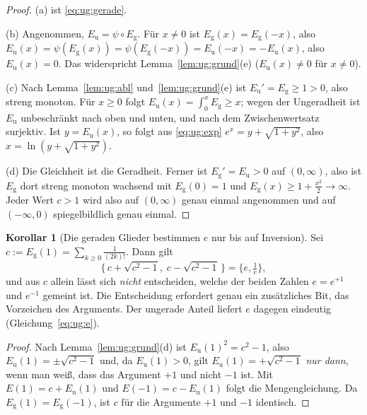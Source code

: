 \documentclass[a4paper,12pt,twoside]{report}
\theoremstyle{definition}
\newtheorem{korollar}{Korollar}
\begin{document}
\begin{proof}
(a) ist \eqref{eq:ug:gerade}.

(b) Angenommen, $E_{\mathrm u}=\psi\circ E_{\mathrm g}$. Für $x\ne0$ ist $E_{\mathrm g}(x)=E_{\mathrm g}(-x)$, also $E_{\mathrm u}(x)=\psi(E_{\mathrm g}(x))=\psi(E_{\mathrm g}(-x))=E_{\mathrm u}(-x)=-E_{\mathrm u}(x)$, also $E_{\mathrm u}(x)=0$. Das widerspricht Lemma~\ref{lem:ug:grund}(e) ($E_{\mathrm u}(x)\ne0$ für $x\neq0$).

(c) Nach Lemma~\ref{lem:ug:abl} und~\ref{lem:ug:grund}(e) ist $E_{\mathrm u}'=E_{\mathrm g}\ge1>0$, also streng monoton. Für $x\ge0$ folgt $E_{\mathrm u}(x)=\int_0^xE_{\mathrm g}\ge x$; wegen der Ungeradheit ist $E_{\mathrm u}$ unbeschränkt nach oben und unten, und nach dem Zwischenwertsatz surjektiv. Ist $y=E_{\mathrm u}(x)$, so folgt aus \eqref{eq:ug:exp} $e^x=y+\sqrt{1+y^2}$, also $x=\ln(y+\sqrt{1+y^2})$.

(d) Die Gleichheit ist die Geradheit. Ferner ist $E_{\mathrm g}'=E_{\mathrm u}>0$ auf $(0,\infty)$, also ist $E_{\mathrm g}$ dort streng monoton wachsend mit $E_{\mathrm g}(0)=1$ und $E_{\mathrm g}(x)\ge1+\tfrac{x^2}{2}\to\infty$. Jeder Wert $c>1$ wird also auf $(0,\infty)$ genau einmal angenommen und auf $(-\infty,0)$ spiegelbildlich genau einmal.
\end{proof}

\begin{korollar}[Die geraden Glieder bestimmen $e$ nur bis auf Inversion]\label{kor:ug:invers}
Sei $c:=E_{\mathrm g}(1)=\sum_{k\ge0}\frac1{(2k)!}$. Dann gilt
\[
\big\{\,c+\sqrt{c^2-1},\;c-\sqrt{c^2-1}\,\big\}=\Big\{e,\tfrac1e\Big\},
\]
und aus $c$ allein lässt sich \emph{nicht} entscheiden, welche der beiden Zahlen $e=e^{+1}$ und $e^{-1}$ gemeint ist. Die Entscheidung erfordert genau ein zusätzliches Bit, das Vorzeichen des Arguments. Der ungerade Anteil liefert $e$ dagegen eindeutig (Gleichung~\eqref{eq:ug:e}).
\end{korollar}

\begin{proof}
Nach Lemma~\ref{lem:ug:grund}(d) ist $E_{\mathrm u}(1)^2=c^2-1$, also $E_{\mathrm u}(1)=\pm\sqrt{c^2-1}$ und, da $E_{\mathrm u}(1)>0$, gilt $E_{\mathrm u}(1)=+\sqrt{c^2-1}$ \emph{nur dann}, wenn man weiß, dass das Argument $+1$ und nicht $-1$ ist. Mit $E(1)=c+E_{\mathrm u}(1)$ und $E(-1)=c-E_{\mathrm u}(1)$ folgt die Mengengleichung. Da $E_{\mathrm g}(1)=E_{\mathrm g}(-1)$, ist $c$ für die Argumente $+1$ und $-1$ identisch.
\end{proof}
\end{document}
